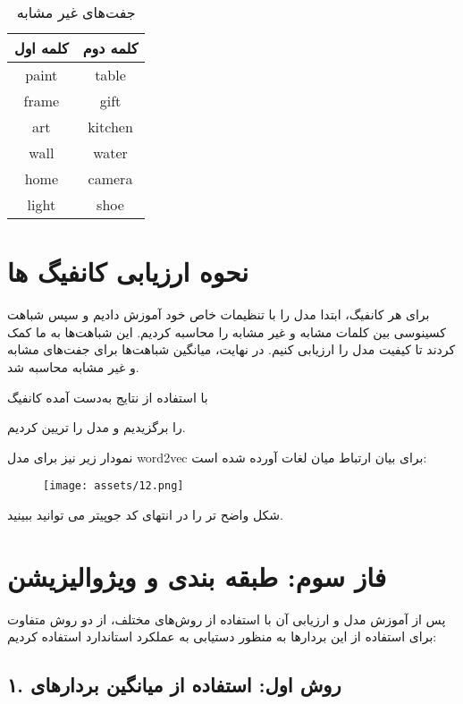 \documentclass[a4paper,12pt]{article}
\begin{document}
	\begin{table}[h]
		\centering
		\caption{جفت‌های غیر مشابه}
		\begin{tabular}{|c|c|}
			\hline
			\textbf{کلمه اول} & \textbf{کلمه دوم} \\
			\hline
			paint & table \\
			\hline
			frame & gift \\
			\hline
			art & kitchen \\
			\hline
			wall & water \\
			\hline
			home & camera \\
			\hline
			light & shoe \\
			\hline
		\end{tabular}
	\end{table}
	
	\section*{نحوه ارزیابی کانفیگ ها}
	
	برای هر کانفیگ، ابتدا مدل  را با تنظیمات خاص خود آموزش دادیم و 
	سپس شباهت کسینوسی بین کلمات مشابه و غیر مشابه را محاسبه کردیم. این شباهت‌ها 
	به ما کمک کردند تا کیفیت مدل را ارزیابی کنیم. در نهایت، میانگین شباهت‌ها برای 
	جفت‌های مشابه و غیر مشابه محاسبه شد.
	
	با استفاده از نتایج به‌دست آمده کانفیگ 
	\begin{latin}
	\end{latin}
		را برگزیدیم و مدل را تریین کردیم.
		
نمودار زیر نیز برای مدل word2vec برای بیان ارتباط میان لغات آورده شده است:

\begin{figure}[H]
	\centering
	\texttt{[image: assets/12.png]}
\end{figure}
	
	شکل واضح تر را در انتهای کد جوپیتر می توانید ببینید. 
	\section{فاز سوم: طبقه بندی و ویژوالیزیشن}

	
	پس از آموزش مدل  و ارزیابی آن با استفاده از روش‌های مختلف، از دو 
	روش متفاوت برای استفاده از این بردارها به منظور دستیابی به عملکرد استاندارد استفاده کردیم:

	
	\subsection*{۱. روش اول: استفاده از میانگین بردارهای }
	
\end{document}
